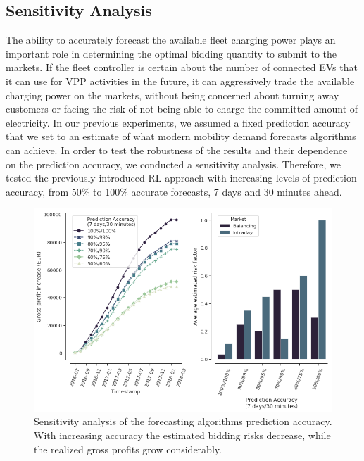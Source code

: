\documentclass[a4paper, 12pt]{article}
\begin{document}
\subsection{Sensitivity Analysis}
\label{sec:org3b15a67}
The ability to accurately forecast the available fleet charging power plays an
important role in determining the optimal bidding quantity to submit to the
markets. If the fleet controller is certain about the number of connected EVs
that it can use for VPP activities in the future, it can aggressively trade the
available charging power on the markets, without being concerned about turning
away customers or facing the risk of not being able to charge the committed
amount of electricity. In our previous experiments, we assumed a fixed
prediction accuracy that we set to an estimate of what modern mobility demand
forecasts algorithms can achieve. In order to test the robustness of the results
and their dependence on the prediction accuracy, we conducted a sensitivity
analysis. Therefore, we tested the previously introduced RL approach with
increasing levels of prediction accuracy, from 50\% to 100\% accurate forecasts, 7
days and 30 minutes ahead.

\begin{figure}[htb]
\centering
\includegraphics[width=1\linewidth]{fig/rl-accuracy.png}
\caption[Sensivity Analysis of Prediction Accuracy]{Sensitivity analysis of the forecasting algorithms prediction accuracy. With increasing accuracy the estimated bidding risks decrease, while the realized gross profits grow considerably. \label{fig-sens-accuracy}}
\end{figure}
\end{document}
